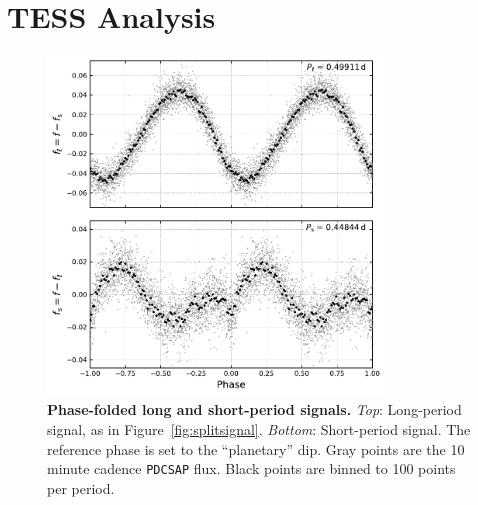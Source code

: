 \documentclass[12pt,twocolumn,tighten]{aastex62}
\begin{document}
\section{TESS Analysis}
\label{sec:analysis}

\begin{figure}[t]
	\begin{center}
		\leavevmode
		\includegraphics[width=0.8\textwidth]{f3.pdf}
	\end{center}
	\vspace{-0.7cm}
	\caption{ {\bf Phase-folded long and short-period signals.}
		{\it Top}: Long-period signal, as in Figure~\ref{fig:splitsignal}.
		{\it Bottom}: Short-period signal. The reference phase is set to the
		``planetary'' dip.  Gray points are the 10 minute cadence
		\texttt{PDCSAP} flux.  Black points are binned to 100 points per
		period.
		\label{fig:phasefold}
	}
\end{figure}
\end{document}
